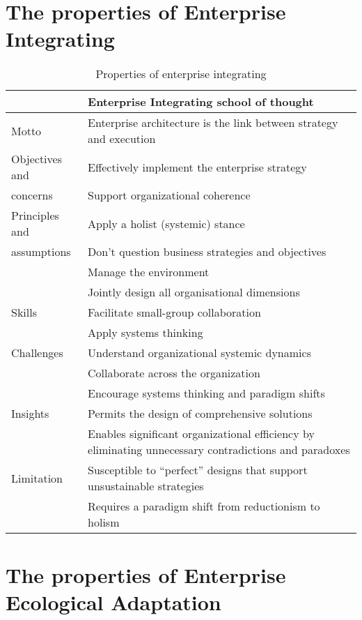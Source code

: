 \section{The properties of Enterprise Integrating}
\begin{small}
\begin{longtable}{p{}p{}}
	\toprule
	& \textbf{Enterprise Integrating school of thought} \\ \midrule%
	\endhead%
	\hline
	\caption{Properties of enterprise integrating \parencite[p. 39]{Lapalme2012}}
	\label{tab:interpriseintegrating}	
	\endfoot%
	Motto    		& Enterprise architecture is the link between strategy and execution \\
	Objectives and 	& Effectively implement the enterprise strategy \\
	concerns		& Support organizational coherence \\
	Principles and  & Apply a holist (systemic) stance \\
	assumptions		& Don’t question business strategies and objectives  \\
					& Manage the environment \\
					& Jointly design all organisational dimensions \\
	Skills 			& Facilitate small-group collaboration \\
					& Apply systems thinking \\
	Challenges		& Understand organizational systemic dynamics \\
					& Collaborate across the organization \\
					& Encourage systems thinking and paradigm shifts \\
	Insights		& Permits the design of comprehensive solutions \\
					& Enables significant organizational efficiency by eliminating unnecessary contradictions and paradoxes \\
	Limitation		& Susceptible to “perfect” designs that support unsustainable strategies \\
					& Requires a paradigm shift from reductionism to holism \\
	\bottomrule
\end{longtable}
\end{small}

\section{The properties of Enterprise Ecological Adaptation}
\label{appsec:eea}

